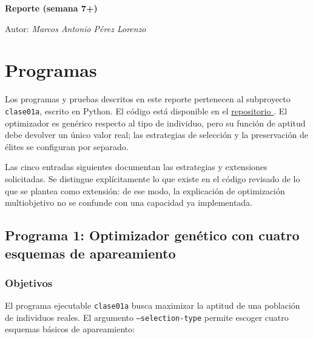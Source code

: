 \documentclass[12pt,a4paper]{article}
\begin{document}
\begin{titlepage}
  \centering
  {\huge\bfseries Reporte (semana 7+)\par}
  \vspace{1em}
  {\Large Autor: \itshape Marcos Antonio Pérez Lorenzo\par}
\end{titlepage}

\pagebreak



\section{Programas}

Los programas y pruebas descritos en este reporte pertenecen al subproyecto
\texttt{clase01a}, escrito en Python. El código está disponible en el
\href{https://github.com/MarcosHCK/master-programming/tree/master/clase01a}
{repositorio \faGithubSquare}. El optimizador es genérico respecto al tipo de
individuo, pero su función de aptitud debe devolver un único valor real; las
estrategias de selección y la preservación de élites se configuran por separado.

Las cinco entradas siguientes documentan las estrategias y extensiones
solicitadas. Se distingue explícitamente lo que existe en el código revisado de
lo que se plantea como extensión: de ese modo, la explicación de optimización
multiobjetivo no se confunde con una capacidad ya implementada.

\subsection{Programa 1: Optimizador genético con cuatro esquemas de apareamiento}

\subsubsection{Objetivos}

El programa ejecutable \texttt{clase01a} busca maximizar la aptitud de una
población de individuos reales. El argumento \texttt{--selection-type}
permite escoger cuatro esquemas básicos de apareamiento:
\end{document}
